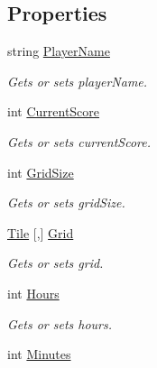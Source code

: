 \subsection*{Properties}
\begin{DoxyCompactItemize}
\item 
string \mbox{\hyperlink{class_game_1_1_game_model_abbe450e31b940844f94cd3d9cec2f50f}{Player\+Name}}
\begin{DoxyCompactList}\small\item\em Gets or sets player\+Name. \end{DoxyCompactList}\item 
int \mbox{\hyperlink{class_game_1_1_game_model_a769c059d4add114f0253064fcc909ddd}{Current\+Score}}
\begin{DoxyCompactList}\small\item\em Gets or sets current\+Score. \end{DoxyCompactList}\item 
int \mbox{\hyperlink{class_game_1_1_game_model_afc483c3acb6b61666a4d97d25bd9149d}{Grid\+Size}}
\begin{DoxyCompactList}\small\item\em Gets or sets grid\+Size. \end{DoxyCompactList}\item 
\mbox{\hyperlink{class_game_1_1_tile}{Tile}} \mbox{[},\mbox{]} \mbox{\hyperlink{class_game_1_1_game_model_a435126a3c8089719816ae19daf5c1c59}{Grid}}
\begin{DoxyCompactList}\small\item\em Gets or sets grid. \end{DoxyCompactList}\item 
int \mbox{\hyperlink{class_game_1_1_game_model_a0eaa30ff6e7b136f27f973610ea6277b}{Hours}}
\begin{DoxyCompactList}\small\item\em Gets or sets hours. \end{DoxyCompactList}\item 
int \mbox{\hyperlink{class_game_1_1_game_model_a6a07136158c57f25dc9fb8a54ddf0536}{Minutes}}

\end{DoxyCompactItemize}

